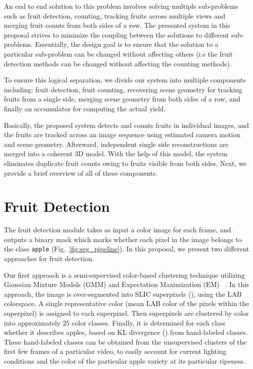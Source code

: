 %
An end to end solution to this problem involves solving multiple sub-problems such as fruit detection, counting, tracking fruits across multiple views and merging fruit counts from both sides of a row. The presented system in this proposal strives to minimize the coupling between the solutions to different sub-problems. Essentially, the design goal is to ensure that the solution to a particular sub-problem can be changed without affecting others (i.e the fruit detection methods can be changed without affecting the counting methods). 

To ensure this logical separation, we divide our system into multiple components including: fruit detection, fruit counting, recovering scene geometry for tracking fruits from a single side, merging scene geometry from both sides of a row, and finally an accumulator for computing the actual yield.

Basically, the proposed system detects and counts fruits in individual images, and the fruits are tracked across an image sequence using estimated camera motion and scene geometry. Afterward, independent single side reconstructions are merged into a coherent 3D model. With the help of this model, the system eliminates duplicate fruit counts owing to fruits visible from both sides. Next, we provide a brief overview of all of these components.

%
\section{Fruit Detection}\label{subsec:syssegmentation}

The fruit detection module takes as input a color image for each frame, and outputs a binary mask which marks whether each pixel in the image belongs to the class \texttt{apple} (Fig.~\ref{fig:seg_pipeline}). In this proposal, we present two different approaches for fruit detection. 

Our first approach is a semi-supervised color-based clustering technique utilizing Gaussian Mixture Models (GMM) and Expectation Maximization (EM)~\cite{moon_expectation-maximization_1996} \cite{roy_vision-based_2018}. In this approach, the image is over-segmented into SLIC superpixels (\cite{achanta2012slic}), using the LAB~\cite{connolly1997study} colorspace. A single representative color (mean LAB color of the pixels within the superpixel) is assigned to each superpixel. Then superpixels are clustered by color into approximately $25$ color classes. Finally, it is determined for each class whether it describes apples, based on KL divergence (\cite{goldbergerKLdivergence}) from hand-labeled classes. These hand-labeled classes can be obtained from the unsupervised clusters of the first few frames of a particular video, to easily account for current lighting conditions and the color of the particular apple variety at its particular ripeness.

